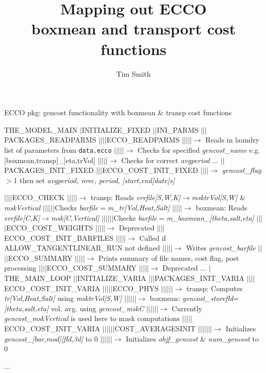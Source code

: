 \documentclass[a4paper,10pt]{article}
\title{\vspace{-8ex}Mapping out ECCO \\ boxmean and transport cost functions}
\author{Tim Smith}
\date{\vspace{-5ex}}
\newcommand{\ai}{$|$\hspace{\algorithmicindent}}
\begin{document}
\maketitle

\begin{algorithm}
  \caption{ECCO pkg: gencost functionality with boxmean \& transp cost functions}
  \begin{algorithmic}
   \label{alg:ecco}
   \STATE
   \STATE THE\_MODEL\_MAIN
   \STATE\ai INITIALIZE\_FIXED
   \STATE\ai\ai INI\_PARMS
   \STATE\ai\ai\ai PACKAGES\_READPARMS
   \STATE\ai\ai\ai\ai ECCO\_READPARMS
   \STATE\ai\ai\ai\ai\ai $\rightarrow$ Reads in laundry list of parameters from \texttt{data.ecco}
   \STATE\ai\ai\ai\ai\ai $\rightarrow$ Checks for specified \textit{gencost\_name} e.g. [boxmean,transp]\_[eta,trVol]
   \STATE\ai\ai\ai\ai\ai $\rightarrow$ Checks for correct \textit{avgperiod}
   \STATE...
   \STATE\ai\ai PACKAGES\_INIT\_FIXED
   \STATE\ai\ai\ai ECCO\_COST\_INIT\_FIXED
   \STATE\ai\ai\ai\ai $\rightarrow$ \textit{gencost\_flag}$>$1 then set \textit{avgperiod, nrec, period}, \textit{[start,end]date[s]}
   
   \STATE\ai\ai\ai\ai ECCO\_CHECK
   \STATE\ai\ai\ai\ai\ai $\rightarrow$ transp: Reads \textit{errfile[S,W,K]}$\rightarrow$\textit{msktrVol[S,W]} \& \textit{mskVertical} 
   \STATE\ai\ai\ai\ai\ai\ai  Checks \textit{barfile}$=$\textit{m\_tr[Vol,Heat,Salt]}
   \STATE\ai\ai\ai\ai\ai $\rightarrow$ boxmean: Reads \textit{errfile[C,K]}$\rightarrow$\textit{msk[C,Vertical]}
   \STATE\ai\ai\ai\ai\ai\ai  Checks \textit{barfile}$=$\textit{m\_boxmean\_[theta,salt,eta]}
   \STATE\ai\ai\ai\ai ECCO\_COST\_WEIGHTS
   \STATE\ai\ai\ai\ai\ai $\rightarrow$ Deprecated
   \STATE\ai\ai\ai\ai ECCO\_COST\_INIT\_BARFILES
   \STATE\ai\ai\ai\ai\ai $\rightarrow$ Called if ALLOW\_TANGENTLINEAR\_RUN not defined
   \STATE\ai\ai\ai\ai\ai $\rightarrow$ Writes \textit{gencost\_barfile}
   \STATE\ai\ai\ai\ai ECCO\_SUMMARY
   \STATE\ai\ai\ai\ai\ai $\rightarrow$ Prints summary of file names, cost flag, post processing 
   \STATE\ai\ai\ai\ai ECCO\_COST\_SUMMARY
   \STATE\ai\ai\ai\ai\ai $\rightarrow$ Deprecated
   \STATE...
   \STATE\ai THE\_MAIN\_LOOP
   \STATE\ai\ai INITIALIZE\_VARIA
   \STATE\ai\ai\ai PACKAGES\_INIT\_VARIA
   \STATE\ai\ai\ai\ai ECCO\_COST\_INIT\_VARIA
   \STATE\ai\ai\ai\ai\ai ECCO\_PHYS
   \STATE\ai\ai\ai\ai\ai\ai $\rightarrow$ transp: Computes \textit{tr[Vol,Heat,Salt]} using \textit{msktrVol[S,W]}
   \STATE\ai\ai\ai\ai\ai\ai $\rightarrow$ boxmean: \textit{gencost\_storefld}=\textit{[theta,salt,eta]} vol. avg. using \textit{gencost\_mskC} 
   \STATE\ai\ai\ai\ai\ai\ai $\rightarrow$ Currently \textit{gencost\_mskVertical} is used here to mask computations
   \STATE\ai\ai\ai\ai\ai ECCO\_COST\_INIT\_VARIA
   \STATE\ai\ai\ai\ai\ai\ai COST\_AVERAGESINIT
   \STATE\ai\ai\ai\ai\ai\ai\ai $\rightarrow$ Initializes \textit{gencost\_[bar,mod][fld,3d]} to 0
   \STATE\ai\ai\ai\ai\ai\ai $\rightarrow$ Initializes \textit{objf\_gencost} \& \textit{num\_gencost} to 0

   \STATE...
 \end{algorithmic}
\end{algorithm}
\end{document}
